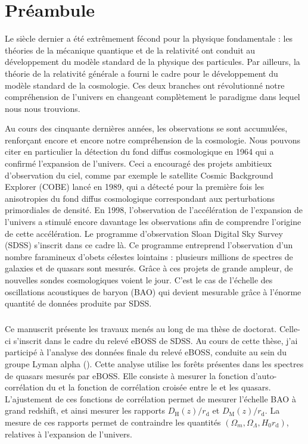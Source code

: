 \chapter*{Préambule}
\thispagestyle{plain}
Le  siècle dernier a été extrêmement fécond pour la physique fondamentale : les théories de la mécanique quantique et de la relativité ont conduit au développement du modèle standard de la physique des particules. Par ailleurs, la théorie de la relativité générale a fourni le cadre pour le développement du modèle standard de la cosmologie. Ces deux branches ont révolutionné notre compréhension de l'univers en changeant complètement le paradigme dans lequel nous nous trouvions.

Au cours des cinquante dernières années, les observations se sont accumulées, renforçant encore et encore notre compréhension de la cosmologie. Nous pouvons citer en particulier la détection du fond diffus cosmologique en 1964 qui a confirmé l'expansion de l'univers. Ceci a encouragé des projets ambitieux d'observation du ciel, comme par exemple le satellite Cosmic Background Explorer (COBE) lancé en 1989, qui a détecté pour la première fois les anisotropies du fond diffus cosmologique correspondant aux perturbations primordiales de densité.
En 1998, l'observation de l'accélération de l'expansion de l'univers a stimulé encore davantage les observations afin de comprendre l'origine de cette accélération. Le programme d'observation Sloan Digital Sky Survey (SDSS) s'inscrit dans ce cadre là. Ce programme entreprend l'observation d'un nombre faramineux d'obets célestes lointains : plusieurs millions de spectres de galaxies et de quasars sont mesurés.
Grâce à ces projets de grande ampleur, de nouvelles sondes cosmologiques voient le jour. C'est le cas de l'échelle des oscillations acoustiques de baryon (BAO) qui devient mesurable grâce à l'énorme quantité de données produite par SDSS.

\paragraph{}
Ce manuscrit présente les travaux menés au long de ma thèse de doctorat. Celle-ci s'inscrit dans le cadre du relevé eBOSS de SDSS.
Au cours de cette thèse, j'ai participé à l'analyse des données finale du relevé eBOSS, conduite au sein du groupe Lyman alpha (\lya{}).
Cette analyse utilise les forêts \lya{} présentes dans les spectres de quasars mesurés par eBOSS.
Elle consiste à mesurer la fonction d'auto-corrélation du \lya{} et la fonction de corrélation croisée entre le \lya{} et les quasars.
L'ajustement de ces fonctions de corrélation permet de mesurer l'échelle BAO à grand redshift, et ainsi mesurer les rapports $D_{\mathrm{H}}(z) / r_{\mathrm{d}}$ et $D_{\mathrm{M}}(z) / r_{\mathrm{d}}$. La mesure de ces rapports permet de contraindre les quantités $(\Omega_{m} , \Omega_{\Lambda} , H_0 r_{\mathrm{d}})$, relatives à l'expansion de l'univers.

